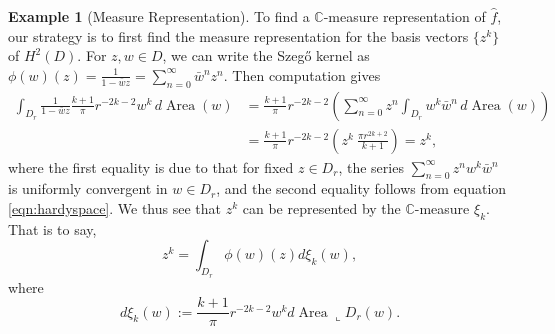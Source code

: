 \documentclass{amsart}
\numberwithin{equation}{section}
\DeclareMathOperator{\Area}{Area}
\theoremstyle{plain}
\theoremstyle{remark}
\theoremstyle{definition}
\newtheorem{example}[subsection]{Example}
\begin{document}
\begin{example}[Measure Representation]
\par
To find a $\mathbb{C}$-measure representation of $\hat{f}$, our strategy is to first find the measure representation for the basis vectors $\{z^k\}$ of $H^2(D)$.
For $z, w \in D$, we can write the Szegő kernel as $\phi(w)(z) =\frac{1}{1 - \bar{w} z} = \sum\limits_{n=0}^\infty \bar{w}^n z^n$.
Then computation gives
\begin{equation*}
    \begin{split}
        \int_{D_r} \frac{1}{1 - \bar{w} z} \frac{k+1}{\pi} r^{-2k-2} w^k \, d\Area(w)
&= \frac{k+1}{\pi} r^{-2k-2} \left(\sum_{n=0}^\infty z^n \int_{D_r} w^k \bar{w}^n \, d\Area(w)\right)\\
&= \frac{k+1}{\pi} r^{-2k-2} \left(z^k \ \frac{\pi r^{2k+2}}{k+1}\right) = z^k,
    \end{split}
\end{equation*}
where the first equality is due to that for fixed $z \in D_r$, the series $\sum_{n=0}^\infty z^n w^k \bar{w}^n$ is uniformly convergent in $w \in D_r$, %
and the second equality follows from equation \eqref{eqn:hardyspace}.
We thus see that $z^k$ can be represented by the $\mathbb{C}$-measure $\xi_k$. That is to say,  
$$
z^k = \int_{D_r} \phi(w)(z)d\xi_k(w),
$$
where
\begin{equation*}
    d\xi_k(w):=\frac{k+1}{\pi} r^{-2k-2} w^k d\Area\llcorner D_r(w).
\end{equation*}





\end{example}
\end{document}
